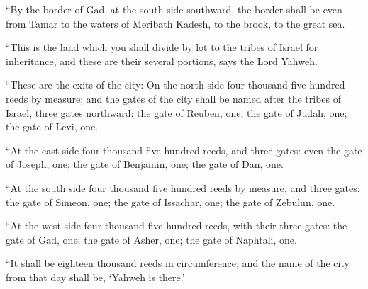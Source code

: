  ``By the border of Gad, at the south side southward, the
border shall be even from Tamar to the waters of Meribath Kadesh, to the
brook, to the great sea.

 ``This is the land which you shall divide by lot to the
tribes of Israel for inheritance, and these are their several portions,
says the Lord Yahweh.

 ``These are the exits of the city: On the north side
four thousand five hundred reeds by measure;  and the
gates of the city shall be named after the tribes of Israel, three gates
northward: the gate of Reuben, one; the gate of Judah, one; the gate of
Levi, one.

 ``At the east side four thousand five hundred reeds, and
three gates: even the gate of Joseph, one; the gate of Benjamin, one;
the gate of Dan, one.

 ``At the south side four thousand five hundred reeds by
measure, and three gates: the gate of Simeon, one; the gate of Issachar,
one; the gate of Zebulun, one.

 ``At the west side four thousand five hundred reeds,
with their three gates: the gate of Gad, one; the gate of Asher, one;
the gate of Naphtali, one.

 ``It shall be eighteen thousand reeds in circumference;
and the name of the city from that day shall be, `Yahweh is there.'
